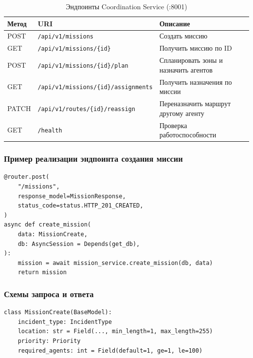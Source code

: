 \documentclass[12pt,a4paper]{article}
\begin{document}
\begin{table}[H]
\centering
\caption{Эндпоинты Coordination Service (:8001)}
\begin{tabularx}{\textwidth}{|l|l|X|}
\hline
\textbf{Метод} & \textbf{URI} & \textbf{Описание} \\
\hline
POST   & \texttt{/api/v1/missions}                     & Создать миссию \\
\hline
GET    & \texttt{/api/v1/missions/\{id\}}              & Получить миссию по ID \\
\hline
POST   & \texttt{/api/v1/missions/\{id\}/plan}         & Спланировать зоны и назначить агентов \\
\hline
GET    & \texttt{/api/v1/missions/\{id\}/assignments}  & Получить назначения по миссии \\
\hline
PATCH  & \texttt{/api/v1/routes/\{id\}/reassign}       & Переназначить маршрут другому агенту \\
\hline
GET    & \texttt{/health}                              & Проверка работоспособности \\
\hline
\end{tabularx}
\end{table}

\subsubsection{Пример реализации эндпоинта создания миссии}

\begin{lstlisting}[caption={POST /api/v1/missions}]
@router.post(
    "/missions",
    response_model=MissionResponse,
    status_code=status.HTTP_201_CREATED,
)
async def create_mission(
    data: MissionCreate,
    db: AsyncSession = Depends(get_db),
):
    mission = await mission_service.create_mission(db, data)
    return mission
\end{lstlisting}

\subsubsection{Схемы запроса и ответа}

\begin{lstlisting}[caption={Pydantic-схема MissionCreate}]
class MissionCreate(BaseModel):
    incident_type: IncidentType
    location: str = Field(..., min_length=1, max_length=255)
    priority: Priority
    required_agents: int = Field(default=1, ge=1, le=100)
\end{lstlisting}
\end{document}
